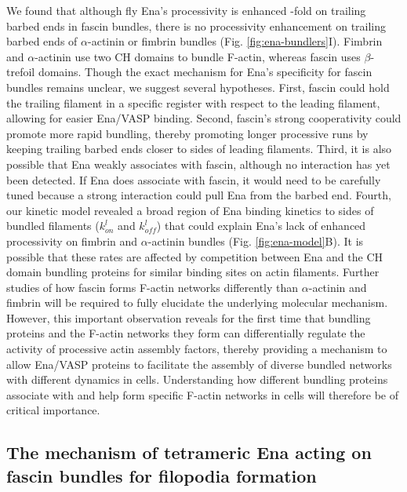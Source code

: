 We found that although fly Ena's processivity is enhanced -fold on trailing barbed ends in fascin bundles, there is no processivity enhancement on trailing barbed ends of $\alpha$-actinin or fimbrin bundles (Fig. \ref{fig:ena-bundlers}I). Fimbrin and $\alpha$-actinin use two CH domains to bundle F-actin, whereas fascin uses $\beta$-trefoil domains. Though the exact mechanism for Ena's specificity for fascin bundles remains unclear, we suggest several hypotheses. First, fascin could hold the trailing filament in a specific register with respect to the leading filament, allowing for easier Ena/VASP binding. Second, fascin's strong cooperativity \citep{yamakita_phosphorylation_1996,winkelman_fascin-_2016} could promote more rapid bundling, thereby promoting longer processive runs by keeping trailing barbed ends closer to sides of leading filaments. Third, it is also possible that Ena weakly associates with fascin, although no interaction has yet been detected. If Ena does associate with fascin, it would need to be carefully tuned because a strong interaction could pull Ena from the barbed end. Fourth, our kinetic model revealed a broad region of Ena binding kinetics to sides of bundled filaments ($k_{on}^{l}$ and $k_{off}^{l}$) that could explain Ena's lack of enhanced processivity on fimbrin and $\alpha$-actinin bundles (Fig. \ref{fig:ena-model}B). It is possible that these rates are affected by competition between Ena and the CH domain bundling proteins for similar binding sites on actin filaments. Further studies of how fascin forms F-actin networks differently than $\alpha$-actinin and fimbrin will be required to fully elucidate the underlying molecular mechanism. However, this important observation reveals for the first time that bundling proteins and the F-actin networks they form can differentially regulate the activity of processive actin assembly factors, thereby providing a mechanism to allow Ena/VASP proteins to facilitate the assembly of diverse bundled networks with different dynamics in cells. Understanding how different bundling proteins associate with and help form specific F-actin networks in cells will therefore be of critical importance.
 
\subsection{The mechanism of tetrameric Ena acting on fascin bundles for filopodia formation}\label{filopodia-mechanism}

